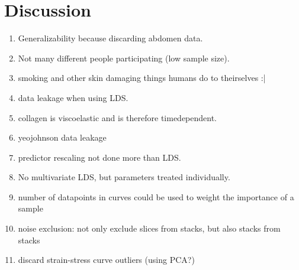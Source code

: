 \chapter{Discussion}

\begin{enumerate}
    \item Generalizability because discarding abdomen data.
    \item Not many different people participating (low sample size).
    \item smoking and other skin damaging things humans do to theirselves :|
    \item data leakage when using LDS.
    \item collagen is viscoelastic and is therefore timedependent.
    \item yeojohnson data leakage
    \item predictor rescaling not done more than LDS.
    \item No multivariate LDS, but parameters treated individually.
    \item number of datapoints in curves could be used to weight the importance of a sample
    \item noise exclusion: not only exclude slices from stacks, but also stacks from stacks
    \item discard strain-stress curve outliers (using PCA?)
\end{enumerate}